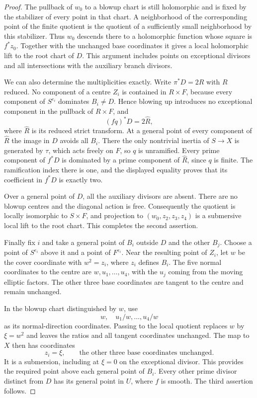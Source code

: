 \begin{proof}
The pullback of $w_0$ to a blowup chart is still holomorphic and is
fixed by the stabilizer of every point in that chart.  A neighborhood
of the corresponding point of the finite quotient is the quotient
of a sufficiently small neighborhood by this stabilizer.  Thus
$w_0$ descends there to a holomorphic function whose square is
$f^*z_0$.  Together with the unchanged base coordinates it gives a
local holomorphic lift to the root chart of $D$.  This argument
includes points on exceptional divisors and all intersections with
the auxiliary branch divisors.

We can also determine the multiplicities exactly.  Write
$\pi^*D=2R$ with $R$ reduced.  No component of a centre $Z_i$ is
contained in $R\times F$, because every component of $S^{e_i}$
dominates $B_i\ne D$.  Hence blowing up introduces no exceptional
component in the pullback of $R\times F$, and
\[
 (f q)^*D=2\widehat R,
\]
where $\widehat R$ is its reduced strict transform.  At a general
point of every component of $\widehat R$ the image in $D$ avoids all
$B_i$.  There the only nontrivial inertia of $S\to X$ is generated
by $\tau$, which acts freely on $F$, so $q$ is unramified.  Every
prime component of $f^*D$ is dominated by a prime component of
$\widehat R$, since $q$ is finite.  The ramification index there is
one, and the displayed equality proves that its coefficient in
$f^*D$ is exactly two.

Over a general point of $D$, all the auxiliary divisors are absent.
There are no blowup centres and the diagonal action is free.
Consequently the quotient is locally isomorphic to $S\times F$, and
projection to $(w_0,z_2,z_3,z_4)$ is a submersive local lift to the
root chart.  This completes the second assertion.

Finally fix $i$ and take a general point of $B_i$ outside $D$ and the
other $B_j$.  Choose a point of $S^{e_i}$ above it and a point of
$F^{e_i}$.  Near the resulting point of $Z_i$, let $w$ be the cover
coordinate with $w^2=z_i$, where $z_i$ defines $B_i$.  The five normal
coordinates to the centre are $w,u_1,\ldots,u_4$, with the $u_j$
coming from the moving elliptic factors.  The other three base
coordinates are tangent to the centre and remain unchanged.

In the blowup chart distinguished by $w$, use
\[
 w,\quad u_1/w,\ldots,u_4/w
\]
as its normal-direction coordinates.  Passing to the local quotient
replaces $w$ by $\xi=w^2$ and leaves the ratios and all tangent
coordinates unchanged.  The map to $X$ then has coordinates
\[
 z_i=\xi,
 \qquad\text{the other three base coordinates unchanged}.
\]
It is a submersion, including at $\xi=0$ on the exceptional divisor.
This provides the required point above each general point of $B_i$.
Every other prime divisor distinct from $D$ has its general point in
$U$, where $f$ is smooth.  The third assertion follows.
\end{proof}

